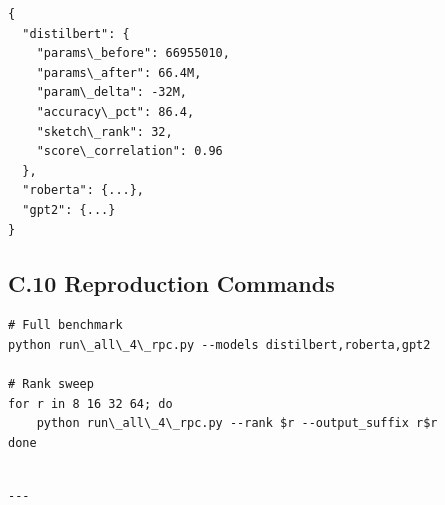 \begin{lstlisting}
{
  "distilbert": {
    "params\_before": 66955010,
    "params\_after": 66.4M,
    "param\_delta": -32M,
    "accuracy\_pct": 86.4,
    "sketch\_rank": 32,
    "score\_correlation": 0.96
  },
  "roberta": {...},
  "gpt2": {...}
}
\end{lstlisting}

\subsection{C.10 Reproduction Commands}

\begin{lstlisting}
# Full benchmark
python run\_all\_4\_rpc.py --models distilbert,roberta,gpt2

# Rank sweep
for r in 8 16 32 64; do
    python run\_all\_4\_rpc.py --rank $r --output_suffix r$r
done
\end{lstlisting}
\begin{lstlisting}

---
\end{lstlisting}